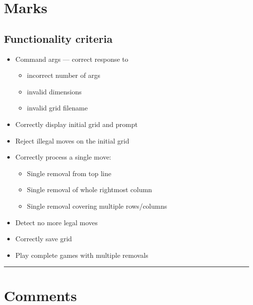 \section{Marks}

\subsection{Functionality criteria}

\begin{center}
\begin{itemize}
\item Command args --- correct response to
\begin{itemize}
 \item incorrect number of args
 \item invalid dimensions
 \item invalid grid filename
\end{itemize}
\item Correctly display initial grid and prompt
\item Reject illegal moves on the initial grid
\item Correctly process a single move:
\begin{itemize}
 \item Single removal from top line
 \item Single removal of whole rightmost column
 \item Single removal covering multiple rows/columns
\end{itemize}
\item Detect no more legal moves
\item Correctly save grid
\item Play complete games with multiple removals
\end{itemize}
\end{center}

\hrule
\section{Comments}\label{sec:breakdown}

